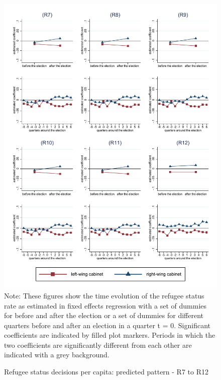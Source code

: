 \documentclass[11pt,a4paper]{scrartcl}
\begin{document}
\clearpage
\FloatBarrier



\clearpage
\FloatBarrier







\clearpage
\FloatBarrier


\clearpage
\FloatBarrier
\begin{figure}[!ht]
	\caption{Refugee status decisions per capita: predicted pattern - R7 to R12}
	\includegraphics[width=1\textwidth]{../results/decisions/refugeestatus_rate_graphs_R7-R12.pdf}
	\scriptsize{Note: These figures show the time evolution of the refugee status rate as estimated in fixed effects regression with a set of dummies for before and after the election or a set of dummies for different quarters before and after an election in a quarter t = 0. Significant coefficients are indicated by filled plot markers. Periods in which the two coefficients are significantly different from each other are indicated with a grey background.}
\end{figure}
\end{document}
